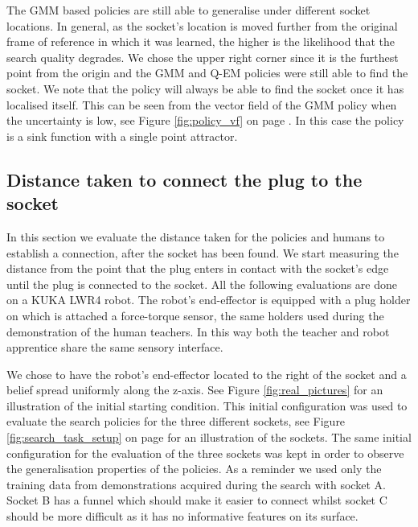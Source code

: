 The GMM based policies are still able to generalise under different socket locations. In general, as the socket's location is moved 
further from the original frame of reference in which it was learned, the higher is the likelihood that the search quality degrades. We 
chose the upper right corner since it is the furthest point from the origin and the GMM and Q-EM policies were still able to find 
the socket. We note that the policy will always be able to find the socket once it has localised itself. This can be seen from the vector field 
of the GMM policy when the uncertainty is low, see Figure \ref{fig:policy_vf} on page \pageref{fig:policy_vf}. In this case the policy is a sink function 
with a single point attractor.

\subsection{Distance taken to connect the plug to the socket}
In this section we evaluate the distance taken for the policies and humans to establish a connection, after the socket 
has been found. We start measuring the distance 
from the point that the plug enters in contact with the socket's edge until the plug is connected to the socket. All the following evaluations are done 
on a KUKA LWR4 robot. The robot's end-effector is equipped with a plug holder on which is attached a force-torque sensor, 
the same holders used during the demonstration of the human teachers. In this way both the teacher and robot apprentice share 
the same sensory interface.

We chose to have the robot's end-effector located to the right of the socket and a belief spread uniformly 
along the z-axis. See Figure \ref{fig:real_pictures} for an illustration of the initial starting condition.
This initial configuration was used to evaluate the search policies for the three different sockets, see Figure \ref{fig:search_task_setup} 
on page \pageref{fig:search_task_setup} for an illustration of the sockets. The same initial configuration for 
the evaluation of the three sockets was kept in order to observe the generalisation properties of the policies. 
As a reminder we used only the training data from demonstrations acquired during the search with socket A. Socket B has a funnel which should make it 
easier to connect whilst socket C should be more difficult as it has no informative features on its surface. 

